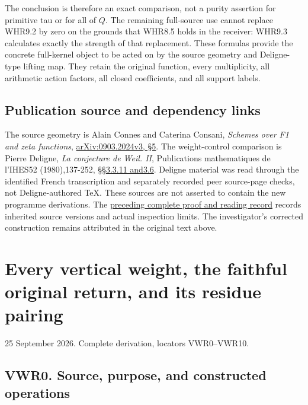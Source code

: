 The conclusion is therefore an exact comparison, not a purity assertion
for primitive tau or for all of \(Q\). The remaining full-source use
cannot replace WHR9.2 by zero on the grounds that WHR8.5 holds in the
receiver: WHR9.3 calculates exactly the strength of that replacement.
These formulas provide the concrete full-kernel object to be acted on by
the source geometry and Deligne-type lifting map. They retain the
original function, every multiplicity, all arithmetic action factors,
all closed coefficients, and all support labels.

\section{Publication source and dependency
links}\label{publication-source-and-dependency-links-8}

The source geometry is Alain Connes and Caterina Consani, \emph{Schemes
over F1 and zeta functions},
\href{https://arxiv.org/abs/0903.2024v3}{arXiv:0903.2024v3, §5}. The
weight-control comparison is Pierre Deligne, \emph{La conjecture de
Weil. II}, Publications mathematiques de l'IHES52 (1980),137-252,
\href{https://www.numdam.org/item/PMIHES_1980__52__137_0/}{§§3.3.11
and3.6}. Deligne material was read through the identified French
transcription and separately recorded peer source-page checks, not
Deligne-authored TeX. These sources are not asserted to contain the new
programme derivations. The
\href{https://github.com/KokunoYumeto/zeta-function-research-reader/blob/36a82ecca98addb8a98b48204e349737856c7223/workbenches/splitzero-tandem/continuations/20260924-cohomology-weight-and-character-lifts/BUILD_AND_REVIEW.md}{preceding
complete proof and reading record} records inherited source versions and
actual inspection limits. The investigator's corrected construction
remains attributed in the original text above.

\chapter{Every vertical weight, the faithful original return, and its
residue
pairing}\label{every-vertical-weight-the-faithful-original-return-and-its-residue-pairing}

25 September 2026. Complete derivation, locators VWR0--VWR10.

\section{VWR0. Source, purpose, and constructed
operations}\label{vwr0.-source-purpose-and-constructed-operations}

